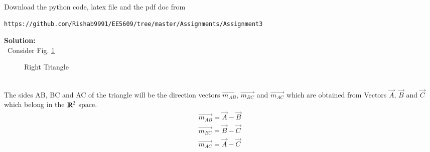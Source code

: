 \documentclass[journal,12pt,twocolumn]{IEEEtran}
\begin{document}
%
Download the python code, latex file and the pdf doc from 
\begin{lstlisting}
https://github.com/Rishab9991/EE5609/tree/master/Assignments/Assignment3
\end{lstlisting}
\textbf{Solution:}
\\\ Consider Fig. \ref{Fig:0}
\begin{figure}[!ht]
    \centering
     \caption{Right Triangle}
     \label{Fig:0}
\end{figure}
\\
The sides AB, BC and AC of the triangle will be the direction vectors $\vec{m_{AB}}$, $\vec{m_{BC}}$ and $\vec{m_{AC}}$ which are obtained from Vectors $\vec{A}$, $\vec{B}$ and $\vec{C}$ which belong in the ${\rm I\!R}^2$ space.\\
\begin{align}
   \vec{m_{AB}} = \vec{A} - \vec{B}\\ 
   \vec{m_{BC}} = \vec{B} - \vec{C}\\
   \vec{m_{AC}} = \vec{A} - \vec{C}
\end{align}\\
\end{document}
